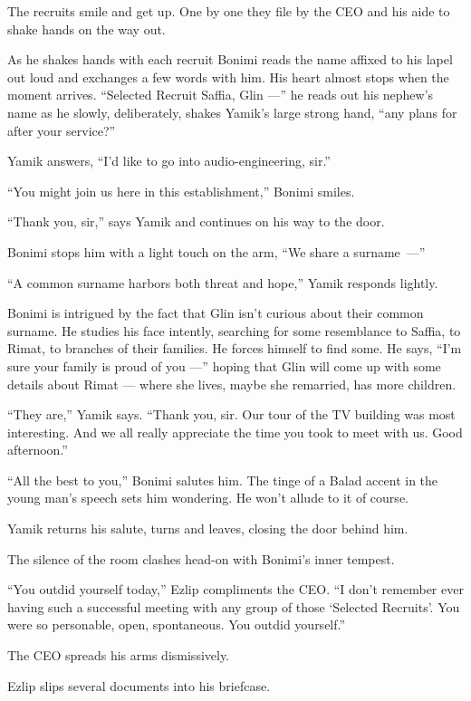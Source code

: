 \documentclass[twoside,11pt,openany]{book}
\begin{document}
The recruits smile and get up. One by one they file by the CEO and his aide to shake hands on the way out.

As he shakes hands with each recruit Bonimi reads the name affixed to his lapel out loud and exchanges a few words
with him. His heart almost stops when the moment arrives. ``Selected Recruit Saffia, Glin ---'' he reads out his nephew's
name as he slowly, deliberately, shakes Yamik's large strong{ }hand, ``any
plans for after your service?''

Yamik answers, ``I'd like to go into audio-engineering, sir.''

``You might join us here in this establishment,'' Bonimi smiles.

``Thank you, sir,'' says Yamik and continues on his way to the door.

Bonimi stops him with a light touch on the arm, ``We share a surname~---''

``A common surname harbors both threat and hope,'' Yamik responds lightly.

Bonimi is intrigued by the fact that Glin isn't curious about their common surname. He studies his face intently,
searching for some resemblance to Saffia, to Rimat, to branches of their families. He forces himself to find some. He
says, ``I'm sure your family{ }is proud of you ---'' hoping that Glin will
come up with some details about Rimat --- where she lives, maybe she remarried, has more children.

``They are,'' Yamik says. ``Thank you, sir. Our tour of the TV building was most
interesting. And we all really appreciate the time you took to meet with us. Good afternoon.''

``All the best to you,'' Bonimi salutes him. The tinge of a Balad accent in the young man's
speech sets him wondering. He won't allude to it of course.

Yamik returns his salute, turns and leaves, closing the door behind him.

The silence of the room clashes head-on with Bonimi's inner tempest.

``You outdid yourself today,'' Ezlip compliments the CEO. ``I don't remember
ever having such a successful meeting with any group of those `Selected Recruits'. You were so personable, open,
spontaneous. You outdid yourself.''

The CEO spreads his arms dismissively.

Ezlip slips several documents into his briefcase.\textbf{ }
\end{document}
